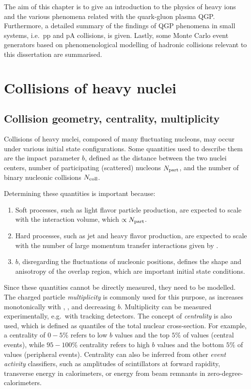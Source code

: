 \def \imgpath {"./figures/colls"}

The aim of this chapter is to give an introduction to the physics of heavy ions and the various phenomena related with the quark-gluon plasma QGP. Furthermore, a detailed summary of the findings of QGP phenomena in small systems, i.e.\ pp and pA collisions, is given. Lastly, some Monte Carlo event generators based on phenomenological modelling of hadronic collisions relevant to this dissertation are summarised.

\section{Collisions of heavy nuclei}

\subsection{Collision geometry, centrality, multiplicity}

Collisions of heavy nuclei, composed of many fluctuating nucleons, may occur under various initial state configurations. Some quantities used to describe them are the impact parameter $b$, defined as the distance between the two nuclei centers, number of participating (scattered) nucleons $N_\mathrm{part}$, and the number of binary nucleonic collisions $N_\mathrm{coll}$.

Determining these quantities is important because:
\begin{enumerate}
\item Soft processes, such as light flavor particle production, are expected to scale with the interaction volume, which $\propto N_\mathrm{part}$.
\item Hard processes, such as jet and heavy flavor production, are expected to scale with the number of large momentum transfer interactions given by \Ncoll.
\item $b$, disregarding the fluctuations of nucleonic positions, defines the shape and anisotropy of the overlap region, which are important initial state conditions.
\end{enumerate}

Since these quantities cannot be directly measured, they need to be modelled. The charged particle \textit{multiplicity} is commonly used for this purpose, as \meanNch increases monotonically with \Npart, \Ncoll, and decreasing $b$. Multiplicity \Nch can be measured experimentally, e.g.\ with tracking detectors. The concept of \textit{centrality} is also used, which is defined as quantiles of the total nuclear cross-section. For example, a centrality of $0-5\%$ refers to low $b$ values and the top $5\%$ of \Nch values (central events), while $95-100\%$ centrality refers to high $b$ values and the bottom $5\%$ of \Nch values (peripheral events). Centrality can also be inferred from other \textit{event activity} classifiers, such as amplitudes of scintillators at forward rapidity, transverse energy in calorimeters, or energy from beam remnants in zero-degree-calorimeters.

